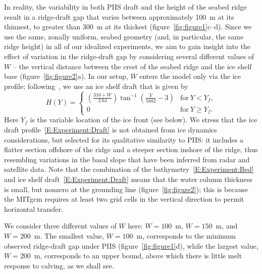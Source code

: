 \documentclass[draft]{agujournal2019}
\begin{document}
In reality, the variability in both PIIS draft and the height of the seabed ridge result in a ridge-draft gap that varies between approximately 100 m at its thinnest, to greater than 300 m at its thickest (figure~\ref{fig:figure1}c--d). Since we use the same, zonally uniform, seabed geometry (and, in particular, the same ridge height) in all of our idealized experiments, we aim to gain insight into the effect of variation in the ridge-draft gap by considering several different values of $W$ -- the vertical distance between the crest of the seabed ridge and the ice shelf base (figure~\ref{fig:figure2}a). In our setup, $W$ enters the model only via the ice profile; following~, we use an ice shelf draft that is given by
\begin{equation}\label{E:Experiment:Draft}
    H(Y) = \begin{cases}
    \left(\frac{310 + W}{2.64}\right)\tan^{-1}\left(\frac{Y}{5882} -3\right) & \text{for}~Y < Y_f,\\
    0  & \text{for}~Y \geq Y_f.
    \end{cases}
\end{equation}
Here $Y_f$ is the variable location of the ice front (see below). We stress that the ice draft profile~\eqref{E:Experiment:Draft} is not obtained from ice dynamics considerations, but selected for its qualitative similarity to PIIS: it includes a flatter section offshore of the ridge and a steeper section inshore of the ridge, thus resembling variations in the basal slope that have been inferred from radar and satellite data. Note that the combination of the bathymetry~\eqref{E:Experiment:Bed} and ice shelf draft~\eqref{E:Experiment:Draft} means that the water column thickness is small, but nonzero at the grounding line (figure~\ref{fig:figure2}); this is because the MITgcm requires at least two grid cells in the vertical direction to permit horizontal transfer.

We consider three different values of $W$ here: $W=100$~m, $W=150$~m, and $W=200$~m. The smallest value, $W=100$~m, corresponds to the minimum observed ridge-draft gap under PIIS (figure~\ref{fig:figure1}d), while the largest value, $W=200$~m, corresponds to an upper bound, above which there is little melt response to calving, as we shall see.
\end{document}
